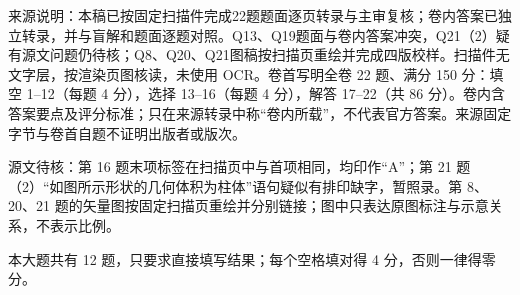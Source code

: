 

\begin{gktip}
来源说明：本稿已按固定扫描件完成22题题面逐页转录与主审复核；卷内答案已独立转录，并与盲解和题面逐题对照。Q13、Q19题面与卷内答案冲突，Q21（2）疑有源文问题仍待核；Q8、Q20、Q21图稿按扫描页重绘并完成四版校样。扫描件无文字层，按渲染页图核读，未使用 OCR。卷首写明全卷 22 题、满分 150 分：填空 1–12（每题 4 分），选择 13–16（每题 4 分），解答 17–22（共 86 分）。卷内含答案要点及评分标准；只在来源转录中称“卷内所载”，不代表官方答案。来源固定字节与卷首自题不证明出版者或版次。

源文待核：第 16 题末项标签在扫描页中与首项相同，均印作“A”；第 21 题（2）“如图所示形状的几何体积为柱体”语句疑似有排印缺字，暂照录。第 8、20、21 题的矢量图按固定扫描页重绘并分别链接；图中只表达原图标注与示意关系，不表示比例。
\end{gktip}


本大题共有 12 题，只要求直接填写结果；每个空格填对得 4 分，否则一律得零分。

